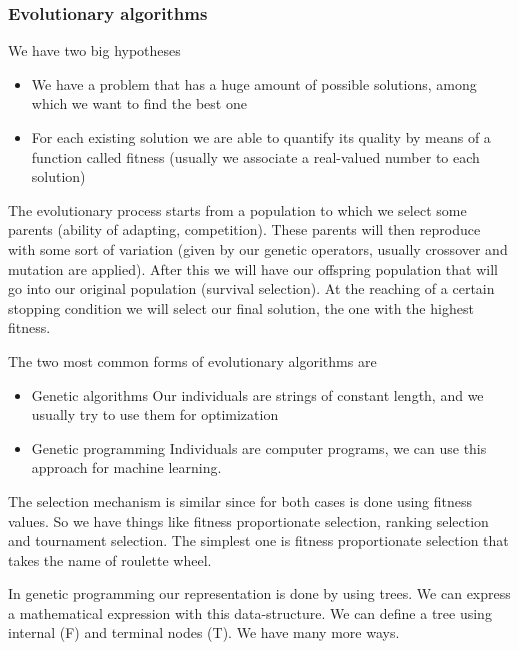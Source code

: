 \subsubsection{Evolutionary algorithms}

We have two big hypotheses
\begin{itemize}
    \item We have a problem that has a huge amount of possible solutions, among which we want to find the best one
    \item For each existing solution we are able to quantify its quality by means of a function called fitness (usually we associate a real-valued number to each solution)
\end{itemize}

The evolutionary process starts from a population to which we select some parents (ability of adapting, competition). These parents will then reproduce with some sort of variation (given by our genetic operators, usually crossover and mutation are applied). After this we will have our offspring population that will go into our original population (survival selection). At the reaching of a certain stopping condition we will select our final solution, the one with the highest fitness.

\vspace{10pt}

The two most common forms of evolutionary algorithms are \begin{itemize}
    \item Genetic algorithms \ra Our individuals are strings of constant length, and we usually try to use them for optimization
    \item Genetic programming \ra Individuals are computer programs, we can use this approach for machine learning. 
\end{itemize}

The selection mechanism is similar since for both cases is done using fitness values. So we have things like fitness proportionate selection, ranking selection and tournament selection. The simplest one is fitness proportionate selection that takes the name of roulette wheel. 

\vspace{10pt}

In genetic programming our representation is done by using trees. We can express a mathematical expression with this data-structure. We can define a tree using internal (F) and terminal nodes (T). We have many more ways. 


